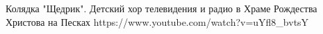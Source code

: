 













Колядка "Щедрик". Детский хор телевидения и радио в Храме Рождества Христова на Песках
https://www.youtube.com/watch?v=uYfl8_bvtsY

